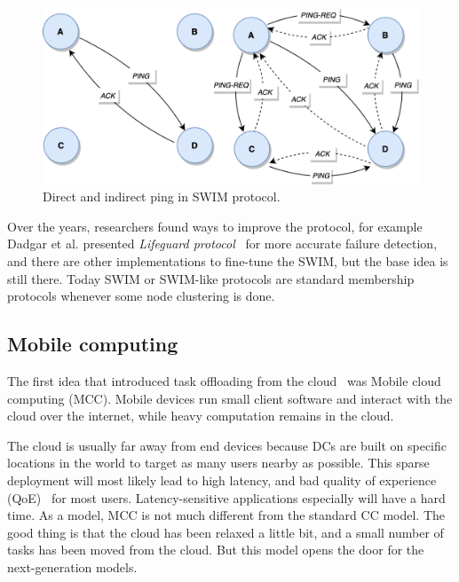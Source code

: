\begin{figure}[H]
	\begin{center}
		\includegraphics[scale=0.7]{images/Figure15.png}
	\end{center}
	\vspace{-0.6cm}
	\caption{Direct and indirect ping in SWIM protocol.}
	\label{fig:fig15}
\end{figure}

\noindent
Over the years, researchers found ways to improve the protocol, for example Dadgar et al. presented \textit{Lifeguard protocol}~\cite{DadgarPC18} for more accurate failure detection, and there are other implementations to fine-tune the SWIM, but the base idea is still there. Today SWIM or SWIM-like protocols are standard membership protocols whenever some node clustering is done.
%
%
\subsection{Mobile computing}\label{sec:mobile_computing}
%
The first idea that introduced task offloading from the cloud~\cite{FernandoLR13, LinLJL19} was Mobile cloud computing (MCC). Mobile devices run small client software and interact with the cloud over the internet, while heavy computation remains in the cloud. 

The cloud is usually far away from end devices because DCs are built on specific locations in the world to target as many users nearby as possible. This sparse deployment will most likely lead to high latency, and bad quality of experience (QoE)~\cite{LinLJL19} for most users. Latency-sensitive applications especially will have a hard time. As a model, MCC is not much different from the standard CC model. The good thing is that the cloud has been relaxed a little bit, and a small number of tasks has been moved from the cloud. But this model opens the door for the next-generation models.

